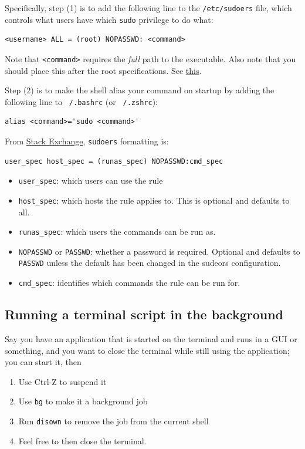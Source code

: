 \documentclass{report}
\begin{document}
Specifically, step (1) is to add the following line to the \texttt{/etc/sudoers}
file, which controls what users have which \texttt{sudo} privilege to 
do what: 
\begin{verbatim}
<username> ALL = (root) NOPASSWD: <command>
\end{verbatim}
Note that \texttt{<command>} requires the \textit{full} path to the executable.
Also note that you should place this after the root specifications. See \href{https://askubuntu.com/questions/100051/why-is-sudoers-nopasswd-option-not-working}{this}.


Step (2) is to make the shell alias your command on startup by adding the following 
line to \texttt{~/.bashrc} (or \texttt{~/.zshrc}): 
\begin{verbatim}
alias <command>='sudo <command>'
\end{verbatim}

From \href{https://superuser.com/questions/1495807/can-someone-explain-what-is-user-all-all-nopasswdall-does-in-sudoers-file}{Stack Exchange}, 
\texttt{sudoers} formatting is:
\begin{quotebox}
	\begin{verbatim}
user_spec host_spec = (runas_spec) NOPASSWD:cmd_spec
	\end{verbatim}
	\begin{itemize}
	\item \texttt{user_spec}: which users can use the rule 
	\item \texttt{host_spec}: which hosts the rule applies 
		to. This is optional and defaults to all. 
	\item \texttt{runas_spec}: which users the commands can be run 
		as. 
	\item \texttt{NOPASSWD} or \texttt{PASSWD}: 
		whether a password is required. Optional and defaults to \texttt{PASSWD}
		unless the default has been changed in the sudeors configuration. 
	\item \texttt{cmd_spec}: identifies which commands the rule can 
		be run for. 
	\end{itemize}
\end{quotebox}

\subsection{Running a terminal script in the background}
Say you have an application that is started on the terminal and runs in a GUI 
or something, and you want to close the terminal while still using the
application; you can start it, then 
\begin{enumerate}
	\item Use Ctrl-Z to suspend it
	\item Use \texttt{bg} to make it a background job
	\item Run \texttt{disown} to remove the job from the current
	shell
	\item Feel free to then close the terminal.
\end{enumerate}
\end{document}
